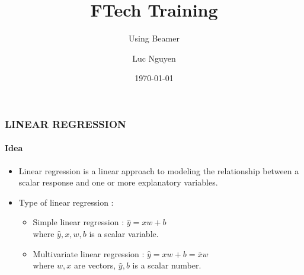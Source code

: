 \documentclass[11pt]{beamer}
\title{FTech Training}
\subtitle{Using Beamer}
\author{Luc Nguyen}
\institute{HUST}
\date{\today}
\begin{document}
\begin{frame}
	\frametitle{\textbf{LINEAR REGRESSION}}
	\framesubtitle{Idea}
			\pause
	\begin{itemize}
		\item Linear regression is a linear approach to modeling the relationship between a scalar response and one or more explanatory variables.
			\pause 
		\item Type of linear regression : 
		\begin{itemize}
			\item Simple linear regression : $ \hat{y} = xw + b $
			 \\ where $\hat{y}, x, w, b$ is a scalar variable.
			\item Multivariate linear regression : $ \hat{y} = xw + b = \bar{x}w$
			 \\ where $w, x$ are vectors, $\hat{y}, b$ is a scalar number.
		\end{itemize}
	\end{itemize}
\end{frame}
\end{document}
